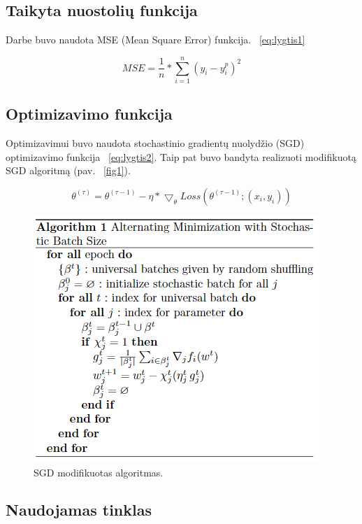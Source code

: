 \documentclass[conference]{IEEEtran}
\begin{document}
\subsection{Taikyta nuostolių funkcija}

Darbe buvo naudota MSE (Mean Square Error) funkcija. ~\eqref{eq:lygtis1}

\begin{equation}
MSE = \frac{1}{n} * \sum_{i=1}^{n} (y_{i} - y_{i}^{p})^{2}
\label{eq:lygtis1}
\end{equation}

\subsection{Optimizavimo funkcija}

Optimizavimui buvo naudota stochastinio gradientų nuolydžio
(SGD) optimizavimo funkcija ~\eqref{eq:lygtis2}. Taip pat buvo bandyta realizuoti modifikuotą SGD algoritmą (pav. ~\ref{fig1}).

\begin{equation}
\theta^{(\tau)} = \theta^{(\tau - 1)} - \eta * \bigtriangledown_{\theta} Loss(\theta^{(\tau - 1)};(x_{i}, y_{i}))
\label{eq:lygtis2}
\end{equation}

\begin{figure}[!h] %
\centerline{\includegraphics[scale=0.4] {images/2.png}}
\caption{SGD modifikuotas algoritmas.}
\label{fig4}
\end{figure}

\subsection{Naudojamas tinklas}
\end{document}
